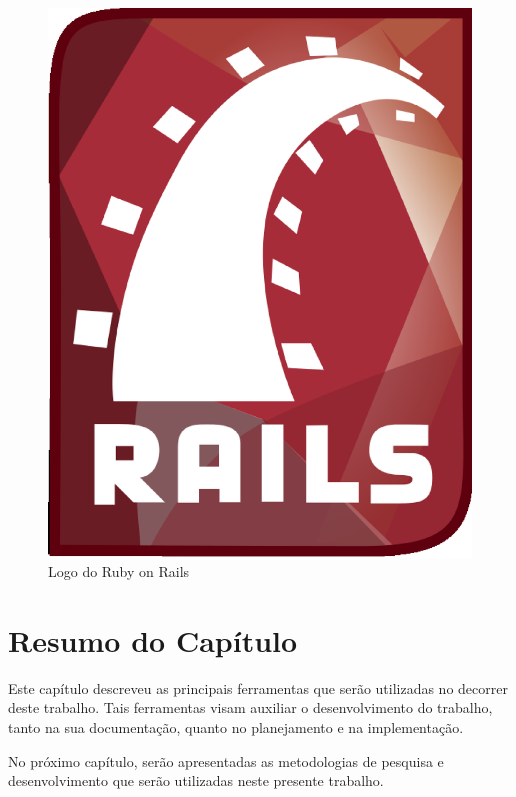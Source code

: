 \begin{figure}[!h]
	\centering
	\includegraphics[scale=0.1]{figuras/capitulo3/ruby_on_rails.eps}
	\caption{Logo do Ruby on Rails}
	\label{ruby_on_rails}
\end{figure}

\section{Resumo do Capítulo}

Este capítulo descreveu as principais ferramentas que serão utilizadas no decorrer deste trabalho. Tais ferramentas visam auxiliar o desenvolvimento do trabalho, tanto na sua documentação, quanto no planejamento e na implementação.

No próximo capítulo, serão apresentadas as metodologias de pesquisa e desenvolvimento que serão utilizadas neste presente trabalho.
